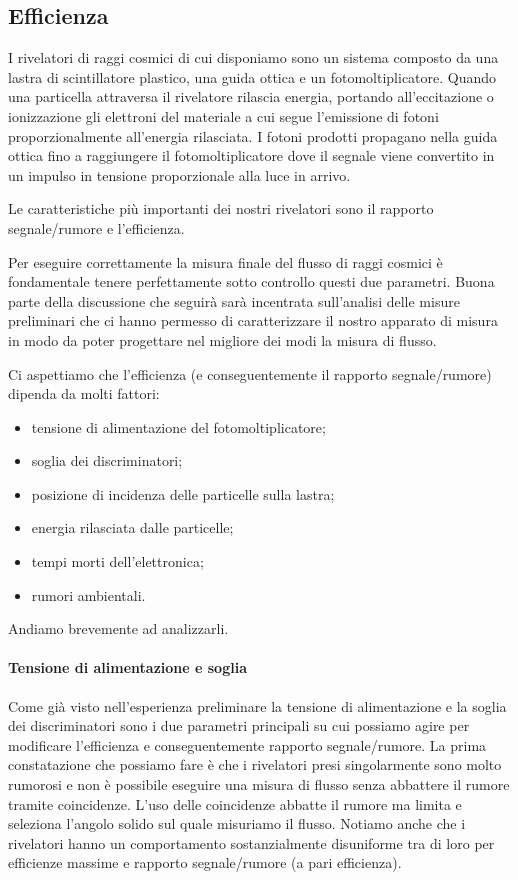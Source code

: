 \subsection{Efficienza}

I rivelatori di raggi cosmici di cui disponiamo sono un sistema composto da una lastra di scintillatore plastico, una guida ottica e un fotomoltiplicatore.
Quando una particella attraversa il rivelatore rilascia energia, portando all'eccitazione o ionizzazione gli elettroni del materiale a cui segue l'emissione di fotoni proporzionalmente all'energia rilasciata.
I fotoni prodotti propagano nella guida ottica fino a raggiungere il fotomoltiplicatore dove il segnale viene convertito in un impulso in tensione proporzionale alla luce in arrivo.

Le caratteristiche più importanti dei nostri rivelatori sono il rapporto segnale/rumore e l'efficienza.

Per eseguire correttamente la misura finale del flusso di raggi cosmici è fondamentale tenere perfettamente sotto controllo questi due parametri. Buona parte della discussione che seguirà sarà incentrata sull'analisi delle misure preliminari che ci hanno permesso di caratterizzare il nostro apparato di misura in modo da poter progettare nel migliore dei modi la misura di flusso.

Ci aspettiamo che l'efficienza (e conseguentemente il rapporto segnale/rumore) dipenda da molti fattori:
\begin{itemize}
	\item tensione di alimentazione del fotomoltiplicatore;
	\item soglia dei discriminatori;
	\item posizione di incidenza delle particelle sulla lastra;
	\item energia rilasciata dalle particelle;
	\item tempi morti dell'elettronica;
	\item rumori ambientali.
\end{itemize}
Andiamo brevemente ad analizzarli.

\paragraph{Tensione di alimentazione e soglia}
Come già visto nell'esperienza preliminare la tensione di alimentazione e la soglia dei discriminatori sono i due parametri principali su cui possiamo agire per modificare l'efficienza e conseguentemente rapporto segnale/rumore. La prima constatazione che possiamo fare è che i rivelatori presi singolarmente sono molto rumorosi e non è possibile eseguire una misura di flusso senza abbattere il rumore tramite coincidenze. L'uso delle coincidenze abbatte il rumore ma limita e seleziona l'angolo solido sul quale misuriamo il flusso. Notiamo anche che i rivelatori  hanno un comportamento sostanzialmente disuniforme tra di loro per efficienze massime e rapporto segnale/rumore (a pari efficienza).

